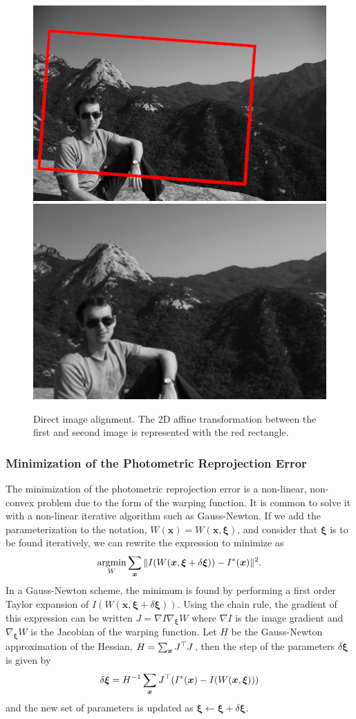 \begin{figure}[h]
	\centering
	\includegraphics[width=0.48\linewidth]{assets/img/image-alignment-1.png}
	\hfill
	\includegraphics[width=0.48\linewidth]{assets/img/image-alignment-2.png}
	\caption{Direct image alignment. The 2D affine transformation between the first
	and second image is represented with the red rectangle.}%
	\label{fig:direct-image-alignment}
\end{figure}

\subsubsection{Minimization of the Photometric Reprojection Error}%
\label{ssub:minimization_photometric_error}

The minimization of the photometric reprojection error is a non-linear,
non-convex problem due to the form of the warping function.
It is common to solve it with a non-linear iterative algorithm such as Gauss-Newton.
If we add the parameterization to the notation, $W(\bm{x}) = W(\bm{x}, \bm{\xi})$,
and consider that $\bm{\xi}$ is to be found iteratively,
we can rewrite the expression to minimize as
\[
	\operatorname*{argmin}_{W} \sum_{\bm{x}}\|I(W(\bm{x}, \bm{\xi} + \delta \bm{\xi})) - I^{*}(\bm{x})\|^2.
\]
In a Gauss-Newton scheme, the minimum is found by performing a first order
Taylor expansion of $I(W(\bm{x}, \bm{\xi} + \delta \bm{\xi}))$.
Using the chain rule, the gradient of this expression can be written
$J = \nabla I \nabla_{\bm{\xi}}W$ where $\nabla I$ is the image gradient
and $\nabla_{\bm{\xi}}W$ is the Jacobian of the warping function.
Let $H$ be the Gauss-Newton approximation of the Hessian,
$H = \sum_{\bm{x}}J^{\top}J$,
then the step of the parameters $\delta \bm{\xi}$ is given by
\[
	\delta \bm{\xi} = H^{-1} \sum_{\bm{x}} J^{\top} (I^{*}(\bm{x}) - I(W(\bm{x}, \bm{\xi})))
\]
and the new set of parameters is updated as $\bm{\xi} \leftarrow \bm{\xi} + \delta \bm{\xi}$.

